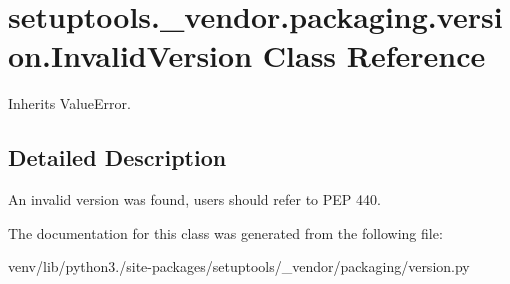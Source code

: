 \hypertarget{classsetuptools_1_1__vendor_1_1packaging_1_1version_1_1_invalid_version}{}\section{setuptools.\+\_\+vendor.\+packaging.\+version.\+Invalid\+Version Class Reference}
\label{classsetuptools_1_1__vendor_1_1packaging_1_1version_1_1_invalid_version}


Inherits Value\+Error.



\subsection{Detailed Description}
\begin{DoxyVerb}An invalid version was found, users should refer to PEP 440.
\end{DoxyVerb}
 

The documentation for this class was generated from the following file\+:\begin{DoxyCompactItemize}
\item 
venv/lib/python3./site-\/packages/setuptools/\+\_\+vendor/packaging/version.\+py\end{DoxyCompactItemize}
